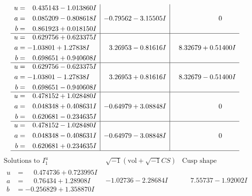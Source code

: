 \documentclass[1p]{elsarticle_modified}
\theoremstyle{definition}
\newcommand{\I}{\sqrt{-1}}
\begin{document}
$$\begin{array}{c|c|c}
\begin{aligned}
u &= \phantom{-}0.435143 - 1.013860 I \\
a &= \phantom{-}0.085209 - 0.808618 I \\
b &= \phantom{-}0.861923 + 0.018150 I\end{aligned}
 & -0.79562 - 3.15505 I & \phantom{-0.000000 } 0 \\ \hline\begin{aligned}
u &= \phantom{-}0.629756 + 0.623375 I \\
a &= -1.03801 + 1.27838 I \\
b &= \phantom{-}0.698651 + 0.940608 I\end{aligned}
 & \phantom{-}3.26953 - 0.81616 I & \phantom{-}8.32679 + 0.51400 I \\ \hline\begin{aligned}
u &= \phantom{-}0.629756 - 0.623375 I \\
a &= -1.03801 - 1.27838 I \\
b &= \phantom{-}0.698651 - 0.940608 I\end{aligned}
 & \phantom{-}3.26953 + 0.81616 I & \phantom{-}8.32679 - 0.51400 I \\ \hline\begin{aligned}
u &= \phantom{-}0.478152 + 1.028480 I \\
a &= \phantom{-}0.048348 + 0.408631 I \\
b &= \phantom{-}0.620681 - 0.234635 I\end{aligned}
 & -0.64979 + 3.08848 I & \phantom{-0.000000 } 0 \\ \hline\begin{aligned}
u &= \phantom{-}0.478152 - 1.028480 I \\
a &= \phantom{-}0.048348 - 0.408631 I \\
b &= \phantom{-}0.620681 + 0.234635 I\end{aligned}
 & -0.64979 - 3.08848 I & \phantom{-0.000000 } 0\\
 \hline 
 \end{array}$$\newpage$$\begin{array}{c|c|c}  
\text{Solutions to }I^u_{1}& \I (\text{vol} + \sqrt{-1}CS) & \text{Cusp shape}\\
 \hline 
\begin{aligned}
u &= \phantom{-}0.474736 + 0.723995 I \\
a &= \phantom{-}0.76434 + 1.28908 I \\
b &= -0.256829 + 1.358870 I\end{aligned}
 & -1.02736 - 2.28684 I & \phantom{-}7.55737 - 1.92002 I \\ \hline\begin{aligned}

\end{aligned}
\end{array}$$
\end{document}
